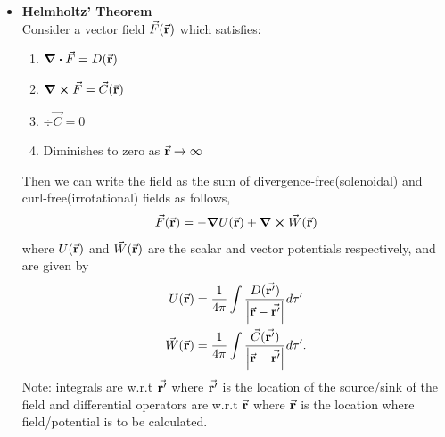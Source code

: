 \documentclass[12pt, oneside]{book}
\begin{document}
\begin{itemize}
\item \textbf{Helmholtz' Theorem}\\
 Consider a vector field $\vec{F}(\va{r})$ which satisfies:
 \begin{enumerate}
 	\item $\div{\vec{F}}=D(\va{r})$
 	\item $\curl{\vec{F}}=\vec{C}(\va{r})$
 	\item $\div{\vec{C}}=0$
 	\item Diminishes to zero as $\va{r}\to\infty$
 \end{enumerate}
Then we can write the field as the sum of divergence-free(solenoidal) and curl-free(irrotational) fields as follows,
\begin{equation}
	\vec{F}(\va{r})=-\grad{U(\va{r})}+\curl{\vec{W}(\va{r})}
\end{equation} 
where $U(\va{r})$ and $\vec{W}(\va{r})$ are the scalar and vector potentials respectively, and are given by
\begin{align}
	      U(\va{r})&=\frac{1}{4\pi}\int \dfrac{D(\va{r'})}{\abs{\va{r}-\va{r'}}}d\tau'  \\
	\vec{W}(\va{r})&=\frac{1}{4\pi}\int \dfrac{\vec{C}(\va{r'})}{\abs{\va{r}-\va{r'}}}d\tau' .
\end{align}
Note: integrals are w.r.t $\va{r'}$ where $\va{r'}$ is the location of the source/sink of the field and differential operators are w.r.t $\va{r}$ where $\va{r}$ is the location where field/potential is to be calculated. 
	\end{itemize}
\end{document}
